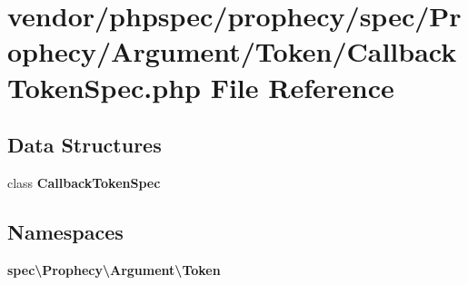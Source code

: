 \section{vendor/phpspec/prophecy/spec/\+Prophecy/\+Argument/\+Token/\+Callback\+Token\+Spec.php File Reference}
\label{_callback_token_spec_8php}
\subsection*{Data Structures}
\begin{DoxyCompactItemize}
\item 
class {\bf Callback\+Token\+Spec}
\end{DoxyCompactItemize}
\subsection*{Namespaces}
\begin{DoxyCompactItemize}
\item 
 {\bf spec\textbackslash{}\+Prophecy\textbackslash{}\+Argument\textbackslash{}\+Token}
\end{DoxyCompactItemize}
